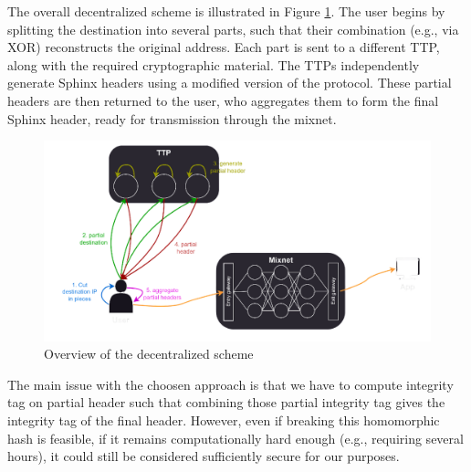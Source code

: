 The overall decentralized scheme is illustrated in Figure \ref{fig:overall_schema}. 
The user begins by splitting the destination into several parts, such that their combination (e.g., via XOR) reconstructs the original address. 
Each part is sent to a different TTP, along with the required cryptographic material. 
The TTPs independently generate Sphinx headers using a modified version of the protocol.  
These partial headers are then returned to the user, who aggregates them to form the final Sphinx header, ready for transmission through the mixnet.

\begin{figure}[H]
    \centering
    \includegraphics[width=0.5\linewidth]{Images/sphinx_ttp.png}
    \caption{Overview of the decentralized scheme}
    \label{fig:overall_schema}
\end{figure}


The main issue with the choosen approach is that we have to compute integrity tag on partial header such 
that combining those partial integrity tag gives the integrity tag of the final header.
However, even if breaking this homomorphic hash is feasible, if it remains computationally hard enough (e.g., requiring several hours), it could still be considered sufficiently secure for our purposes.


